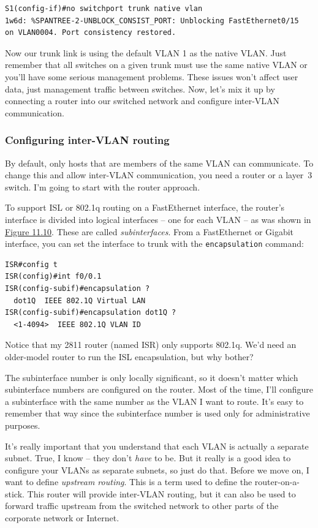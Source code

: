 \begin{verbatim}
S1(config-if)#no switchport trunk native vlan
1w6d: %SPANTREE-2-UNBLOCK_CONSIST_PORT: Unblocking FastEthernet0/15
on VLAN0004. Port consistency restored.
\end{verbatim}

Now our trunk link is
using the default VLAN 1 as the native VLAN. Just remember that all
switches on a given trunk must use the same native VLAN or you'll have
some serious management problems. These issues won't affect user data,
just management traffic between switches. Now, let's mix it up by
connecting a router into our switched network and configure inter-VLAN
communication.

\subsubsection{Configuring inter-VLAN routing}

By default, only hosts that are members of the same VLAN can
communicate. To change this and allow inter-VLAN communication, you need
a router or a layer~3 switch. I'm going to start with the router
approach.

To support ISL or 802.1q routing on a FastEthernet interface, the
router's interface is divided into logical interfaces -- one for each
VLAN -- as was shown in
\protect\hyperlink{c11.xhtmlux5cux23figure11-10}{Figure 11.10}. These
are called \emph{subinterfaces}. From a FastEthernet or Gigabit
interface, you can set the interface to trunk with the
\texttt{encapsulation} command:

\begin{verbatim}
ISR#config t
ISR(config)#int f0/0.1
ISR(config-subif)#encapsulation ?
  dot1Q  IEEE 802.1Q Virtual LAN
ISR(config-subif)#encapsulation dot1Q ?
  <1-4094>  IEEE 802.1Q VLAN ID
\end{verbatim}

Notice that my 2811 router (named ISR) only supports 802.1q. We'd need
an older-model router to run the ISL encapsulation, but why bother?

The subinterface number is only locally significant, so it doesn't
matter which subinterface numbers are configured on the router. Most of
the time, I'll configure a subinterface with the same number as the VLAN
I want to route. It's easy to remember that way since the subinterface
number is used only for administrative purposes.

It's really important that you understand that each VLAN is actually a
separate subnet. True, I know -- they don't \emph{have} to be. But it
really is a good idea to configure your VLANs as separate subnets, so
just do that. Before we move on, I want to define \emph{upstream
routing}. This is a term used to define the router-on-a-stick. This
router will provide inter-VLAN routing, but it can also be used to
forward traffic upstream from the switched network to other parts of the
corporate network or Internet.

